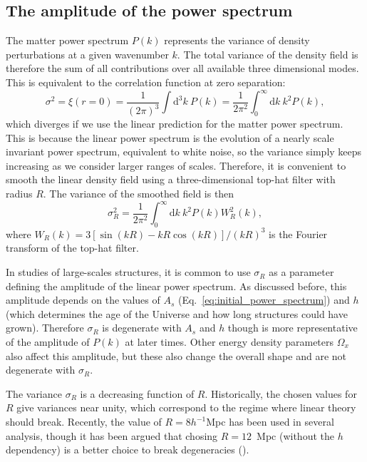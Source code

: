     \subsection{The amplitude of the power spectrum}

    The matter power spectrum $P(k)$ represents the variance of density perturbations 
    at a given wavenumber $k$. The total variance of the density field is therefore 
    the sum of all contributions over all available three dimensional modes. 
    This is equivalent to the correlation function at zero separation:
    \begin{equation}
        \sigma^2 = \xi(r=0) = \frac{1}{(2\pi)^3}\int \mathrm{d}^3k ~ P(k) = \frac{1}{2\pi^2} \int_0^\infty \mathrm{d}k ~k^2 P(k), 
        \label{eq:variance_linear_field}
    \end{equation} 
    which diverges if we use the linear prediction for the matter power spectrum.
    This is because the linear power spectrum is the evolution of a nearly scale 
    invariant power spectrum, equivalent to white noise, so the variance simply 
    keeps increasing as we consider larger ranges of scales. Therefore, it is 
    convenient to smooth the linear density field using a three-dimensional 
    top-hat filter with radius $R$. The variance of the smoothed field is 
    then 
    \begin{equation}
        \sigma_R^2 = \frac{1}{2\pi^2} \int_0^\infty \mathrm{d}k ~k^2 P(k) W_R^2(k),
        \label{eq:variance_linear_field_smoothed}
    \end{equation}
    where $W_R(k) = 3[\sin(kR) - kR \cos(kR)]/(kR)^3$ is the Fourier transform of the
    top-hat filter. 

    In studies of large-scales structures, it is common to use $\sigma_R$ 
    as a parameter defining the amplitude of the linear power spectrum. 
    As discussed before, this amplitude depends on the values of $A_s$ (Eq.~\ref{eq:initial_power_spectrum})
    and $h$ (which determines the age of the Universe and how long structures could have grown).
    Therefore $\sigma_R$ is degenerate with $A_s$ and $h$ though is more representative of
    the amplitude of $P(k)$ at later times.  
    Other energy density parameters $\Omega_x$ also affect this amplitude, but these
    also change the overall shape and are not degenerate with $\sigma_R$. 

    The variance $\sigma_R$ is a decreasing function of $R$. Historically, 
    the chosen values for $R$ give variances near unity, which correspond to 
    the regime where linear theory should break.   
    Recently, the value of $R = 8h^{-1}$Mpc has been used in several analysis, 
    though it has been argued that chosing $R = 12$~Mpc (without the $h$ dependency)
    is a better choice to break degeneracies (\cite{sanchezArgumentsUsingMpc2020}).

